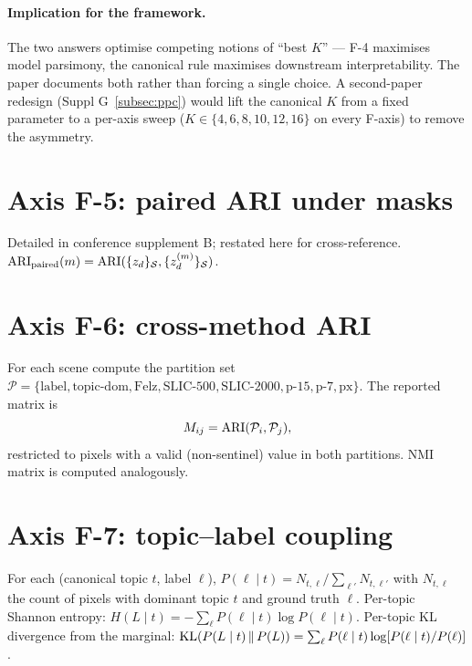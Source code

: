 \documentclass[11pt,a4paper]{article}
\begin{document}
\paragraph{Implication for the framework.} The two answers
optimise competing notions of ``best $K$'' --- F-4 maximises
model parsimony, the canonical rule maximises downstream
interpretability. The paper documents both rather than forcing
a single choice. A second-paper redesign (Suppl
G~\ref{subsec:ppc}) would lift the canonical $K$ from a fixed
parameter to a per-axis sweep ($K \in \{4, 6, 8, 10, 12, 16\}$
on every F-axis) to remove the asymmetry.

\section{Axis F-5: paired ARI under masks}
Detailed in conference supplement B; restated here for cross-reference.
$\mathrm{ARI}_{\text{paired}}(m) = \mathrm{ARI}(\{z_d\}_\mathcal{S},
\{z^{(m)}_d\}_\mathcal{S})$.

\section{Axis F-6: cross-method ARI}
For each scene compute the partition set $\mathcal{P} = \{\text{label},
\text{topic-dom}, \text{Felz}, \text{SLIC-500}, \text{SLIC-2000},
\text{p-15}, \text{p-7}, \text{px}\}$. The reported matrix is
\begin{equation}
M_{ij} = \mathrm{ARI}(\mathcal{P}_i, \mathcal{P}_j),
\end{equation}
restricted to pixels with a valid (non-sentinel) value in both
partitions. NMI matrix is computed analogously.

\section{Axis F-7: topic--label coupling}
For each (canonical topic $t$, label $\ell$),
$P(\ell \mid t) = N_{t,\ell} / \sum_{\ell'} N_{t,\ell'}$ with
$N_{t,\ell}$ the count of pixels with dominant topic $t$ and ground
truth $\ell$. Per-topic Shannon entropy:
$H(L \mid t) = - \sum_\ell P(\ell \mid t) \log P(\ell \mid t)$.
Per-topic KL divergence from the marginal:
$\mathrm{KL}\!\left(P(L \mid t) \,\middle\|\, P(L)\right) = \sum_\ell P(\ell \mid t)
\log [P(\ell \mid t) / P(\ell)]$.
\end{document}
